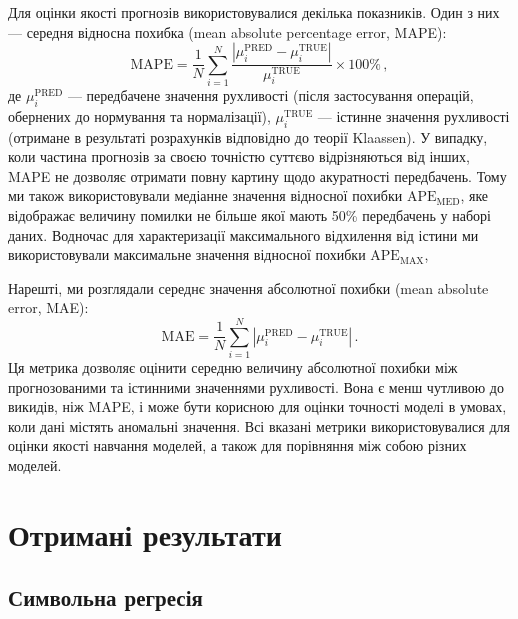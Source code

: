 \documentclass[14pt,a4paper,titlepage,oneside]{book}
\numberwithin{equation}{part}
\begin{document}
Для оцінки якості прогнозів використовувалися декілька показників.
Один з них --- середня відносна похибка (mean absolute percentage error, MAPE):
\begin{equation}
\label{eqMAPE}
    \mathrm{MAPE} = \frac{1}{N}\displaystyle\sum_{i=1}^{N} \frac{|\mu^\mathrm{PRED}_i-\mu^\mathrm{TRUE}_i|}{\mu^\mathrm{TRUE}_i}\times 100 \%\,,
\end{equation}
де
$\mu^\mathrm{PRED}_i$ --- передбачене значення рухливості (після застосування операцій, обернених до нормування та нормалізації),
$\mu^\mathrm{TRUE}_i$ --- істинне значення рухливості (отримане в результаті розрахунків відповідно до теорії Klaassen).
У випадку, коли частина прогнозів за своєю точністю суттєво відрізняються від інших, MAPE  не дозволяє отримати повну картину щодо акуратності передбачень.
Тому ми також використовували медіанне значення відносної похибки $\mathrm{APE}_\mathrm{MED}$,
яке відображає величину помилки не більше якої мають 50\% передбачень у наборі даних.
Водночас для характеризації максимального відхилення від істини ми використовували максимальне значення  відносної похибки
$\mathrm{APE}_\mathrm{MAX}$,

Нарешті, ми розглядали середнє значення абсолютної похибки (mean absolute error, MAE):
\begin{equation}
\label{eqMAE}
    \mathrm{MAE} = \frac{1}{N}\displaystyle\sum_{i=1}^{N} |\mu^\mathrm{PRED}_i-\mu^\mathrm{TRUE}_i|\,.
\end{equation}
Ця метрика дозволяє оцінити середню величину абсолютної похибки між прогнозованими та істинними значеннями рухливості.
Вона є менш чутливою до викидів, ніж MAPE, і може бути корисною для оцінки точності моделі в умовах, коли дані містять аномальні значення.
Всі вказані метрики використовувалися для оцінки якості навчання моделей, а також для порівняння між собою різних моделей.

\chapter{Отримані результати}

\section{Символьна регресія}
\end{document}

